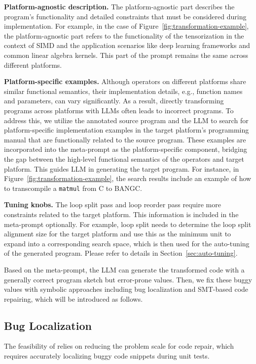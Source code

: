 \textbf{Platform-agnostic description.}
The platform-agnostic part describes the program's functionality and detailed constraints that must be considered during implementation. For example, in the case of Figure~\ref{fig:transformation-example}, the platform-agnostic part refers to the functionality of the tensorization in the context of SIMD and the application scenarios like deep learning frameworks and common linear algebra kernels. This part of the prompt remains the same across different platforms.


 \textbf{Platform-specific examples.}
Although operators on different platforms share similar functional semantics, their implementation details, e.g., function names and parameters, can vary significantly. As a result, directly transforming programs across platforms with LLMs often leads to incorrect programs.
To address this, we utilize the annotated source program and the LLM to search for platform-specific implementation examples in the target platform's programming manual that are functionally related to the source program. These examples are incorporated into the meta-prompt as the platform-specific component, bridging the gap between the high-level functional semantics of the operators and target platform. This guides LLM in generating the target program.
For instance, in Figure~\ref{fig:transformation-example}, the search results include an example of how to transcompile a \texttt{matmul} from C to BANGC.

\textbf{Tuning knobs.}
The loop split pass and loop reorder pass require more constraints related to the target platform.
This information is included in the meta-prompt optionally.
For example, loop split needs to determine the loop split alignment size for the target platform and use this as the minimum unit to expand into a corresponding search space, which is then used for the auto-tuning of the generated program. Please refer to details in Section~\ref{sec:auto-tuning}.

Based on the meta-prompt, the LLM can generate the transformed code with a generally correct program sketch but error-prone values. Then, we fix these buggy values with symbolic approaches including bug localization and SMT-based code repairing, which will be introduced as follows.

\subsection{Bug Localization}
The feasibility of \name{} relies on reducing the problem scale for code repair, which requires accurately localizing buggy code snippets during unit tests.


